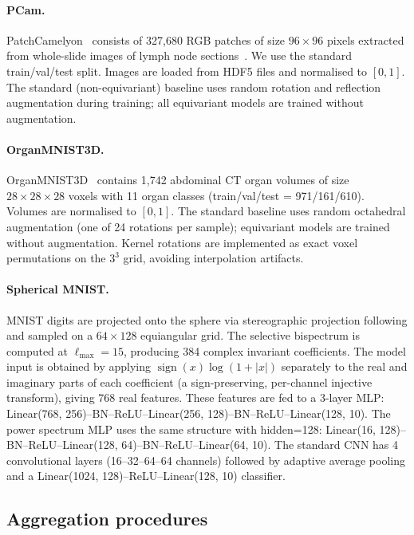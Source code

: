\documentclass{article}
\theoremstyle{definition}
\theoremstyle{remark}
\theoremstyle{definition}
\begin{document}
\paragraph{PCam.}
PatchCamelyon~\citep{veeling2018rotation} consists of 327{,}680 RGB
patches of size $96 \times 96$ pixels extracted from whole-slide
images of lymph node sections~\citep{bejnordi2017camelyon}. We use
the standard train/val/test split. Images are loaded from HDF5 files
and normalised to $[0, 1]$. The standard (non-equivariant) baseline
uses random rotation and reflection augmentation during training; all
equivariant models are trained without augmentation.

\paragraph{OrganMNIST3D.}
OrganMNIST3D~\citep{medmnistv2} contains 1{,}742 abdominal CT organ
volumes of size $28 \times 28 \times 28$ voxels with 11 organ classes
(train/val/test = 971/161/610). Volumes are normalised to $[0, 1]$.
The standard baseline uses random octahedral augmentation (one of 24
rotations per sample); equivariant models are trained without
augmentation. Kernel rotations are implemented as exact voxel
permutations on the $3^3$ grid, avoiding interpolation artifacts.

\paragraph{Spherical MNIST.}
MNIST digits are projected onto the sphere via stereographic
projection following \citet{cohen2018spherical} and sampled on a
$64 \times 128$ equiangular grid. The selective bispectrum is
computed at $\ell_{\max} = 15$, producing 384 complex invariant
coefficients. The model input is obtained by applying
$\operatorname{sign}(x)\log(1+|x|)$ separately to the real and
imaginary parts of each coefficient (a sign-preserving, per-channel
injective transform), giving 768 real features. These features are
fed to a 3-layer MLP: Linear(768, 256)--BN--ReLU--Linear(256,
128)--BN--ReLU--Linear(128, 10). The power spectrum MLP uses the
same structure with hidden=128: Linear(16, 128)--BN--ReLU--Linear(128,
64)--BN--ReLU--Linear(64, 10). The standard CNN has 4 convolutional
layers (16--32--64--64 channels) followed by adaptive average pooling
and a Linear(1024, 128)--ReLU--Linear(128, 10) classifier.

\subsection{Aggregation procedures}
\end{document}
